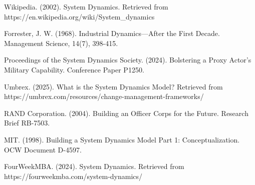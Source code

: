 \documentclass[main.tex]{subfiles}
\begin{document}
\begin{thebibliography}{21}
Wikipedia. (2002). System Dynamics. Retrieved from https://en.wikipedia.org/wiki/System\_dynamics

Forrester, J. W. (1968). Industrial Dynamics—After the First Decade. Management Science, 14(7), 398-415.

Proceedings of the System Dynamics Society. (2024). Bolstering a Proxy Actor's Military Capability. Conference Paper P1250.

Umbrex. (2025). What is the System Dynamics Model? Retrieved from https://umbrex.com/resources/change-management-frameworks/

RAND Corporation. (2004). Building an Officer Corps for the Future. Research Brief RB-7503.

MIT. (1998). Building a System Dynamics Model Part 1: Conceptualization. OCW Document D-4597.

FourWeekMBA. (2024). System Dynamics. Retrieved from https://fourweekmba.com/system-dynamics/

\end{thebibliography}
\end{document}
